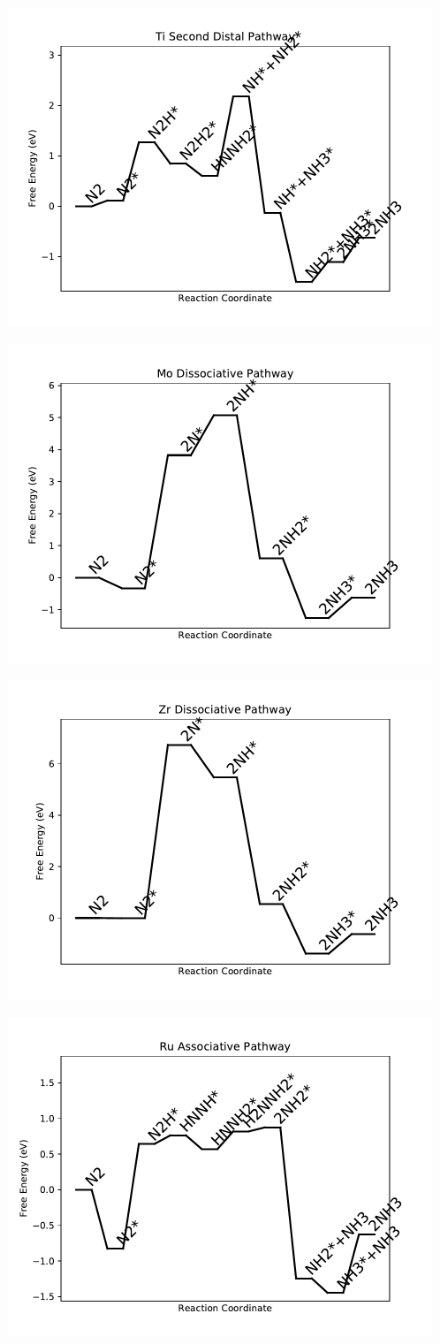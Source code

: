 \documentclass[journal=jacsat,manuscript=article]{achemso}
\begin{document}
\begin{figure}
\includegraphics[width=0.5\linewidth]{data/plots/Ti_distal_2.pdf}
\label{fig:Ti_distal_2}
\end{figure}

\begin{figure}
\includegraphics[width=0.5\linewidth]{data/plots/Mo_dissociative.pdf}
\label{fig:Mo_dissociative}
\end{figure}

\begin{figure}
\includegraphics[width=0.5\linewidth]{data/plots/Zr_dissociative.pdf}
\label{fig:Zr_dissociative}
\end{figure}

\begin{figure}
\includegraphics[width=0.5\linewidth]{data/plots/Ru_associative.pdf}
\label{fig:Ru_associative}
\end{figure}
\end{document}
